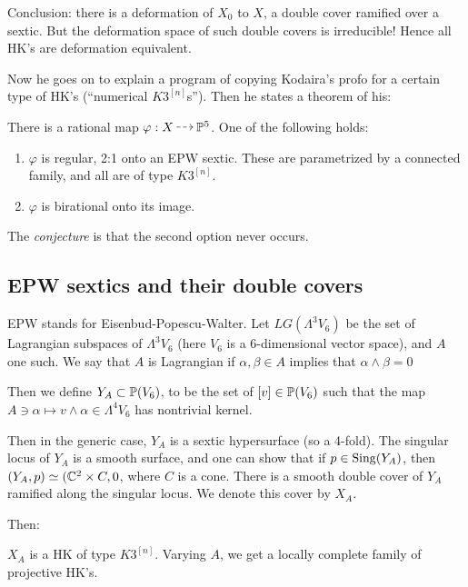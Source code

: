 \documentclass[11pt, english]{article}
\begin{document}
Conclusion: there is a deformation of $X_0$ to $X$, a double cover ramified over a sextic. But the deformation space of such double covers is irreducible! Hence all HK's are deformation equivalent. 

\begin{remark}
Now he goes on to explain a program of copying Kodaira's profo for a certain type of HK's (``numerical $K3^{[n]}$s''). Then he states a theorem of his:
\begin{thm}
There is a rational map $\varphi:X \rmap \PP^5$. One of the following holds:

\begin{enumerate}
	\item $\varphi$ is regular, 2:1 onto an EPW sextic. These are parametrized by a connected family, and all are of type $K3^{[n]}$.
	\item $\varphi$ is birational onto its image.
\end{enumerate}
\end{thm}
The \emph{conjecture} is that the second option never occurs.
\end{remark}

\subsection{EPW sextics and their double covers}

EPW stands for Eisenbud-Popescu-Walter. Let $LG(\Lambda^3 V_6)$ be the set of Lagrangian subspaces of $\Lambda^3 V_6$ (here $V_6$ is a 6-dimensional vector space), and $A$ one such. We say that $A$ is Lagrangian if $\alpha,\beta \in A$ implies that $\alpha \wedge \beta = 0$  

Then we define $Y_A \subset \mathbb{P}(V_6)$, to be the set of $[v] \in \mathbb{P}(V_6)$ such that the map $A \ni \alpha \mapsto v \wedge \alpha \in \Lambda^4 V_6$ has nontrivial kernel. 

Then in the generic case, $Y_A$ is a sextic hypersurface (so a 4-fold). The singular locus of $Y_A$ is a smooth surface, and one can show that if $p \in \operatorname{Sing}(Y_A)$, then $(Y_A,p) \simeq (\mathbb{C}^2 \times C,0$, where $C$ is a cone. There is a smooth double cover of $Y_A$ ramified along the singular locus. We denote this cover by $X_A$.

Then:

\begin{thm}
$X_A$ is a HK of type $K3^{[n]}$. Varying $A$, we get a locally complete family of projective HK's.
\end{thm}
\end{document}
